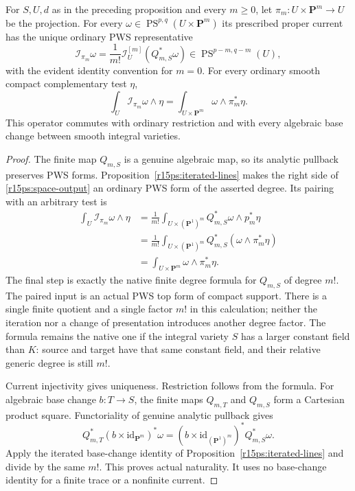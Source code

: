 \begin{theorem}
\label{r15ps:projective-space}
For $S,U,d$ as in the preceding proposition and every $m\geq0$,
let $\pi_m:U\times\mathbf P^m\to U$ be the projection.
For every $\omega\in\operatorname{PS}^{p,q}
(U\times\mathbf P^m)$ its prescribed proper current has the
unique ordinary PWS representative
\[
 \mathcal I_{\pi_m}\omega
   =\frac1{m!}\mathcal I^{[m]}_U(Q_{m,S}^*\omega)
       \in\operatorname{PS}^{p-m,q-m}(U),
\tag{PS15.5}\label{r15ps:space-output}
\]
with the evident identity convention for $m=0$.
For every ordinary smooth compact complementary test $\eta$,
\[
 \int_U\mathcal I_{\pi_m}\omega\wedge\eta
       =\int_{U\times\mathbf P^m}\omega\wedge\pi_m^*\eta.
\tag{PS15.6}\label{r15ps:space-pairing}
\]
This operator commutes with ordinary restriction and with every
algebraic base change between smooth integral varieties.
\end{theorem}

\begin{proof}
The finite map $Q_{m,S}$ is a genuine algebraic map, so its
analytic pullback preserves PWS forms.  Proposition~\ref{r15ps:iterated-lines}
makes the right side of \eqref{r15ps:space-output} an ordinary
PWS form of the asserted degree.
Its pairing with an arbitrary test is
\[
 \begin{split}
 \int_U\mathcal I_{\pi_m}\omega\wedge\eta
 &=\frac1{m!}\int_{U\times(\mathbf P^1)^m}
                         Q_{m,S}^*\omega\wedge p_m^*\eta\\
 &=\frac1{m!}\int_{U\times(\mathbf P^1)^m}
                      Q_{m,S}^*(\omega\wedge\pi_m^*\eta)\\
 &=\int_{U\times\mathbf P^m}\omega\wedge\pi_m^*\eta.
 \end{split}
\tag{PS15.7}\label{r15ps:one-native-factor}
\]
The final step is exactly the native finite degree formula
for $Q_{m,S}$ of degree $m!$.  The paired input is an actual
PWS top form of compact support.  There is a single finite
quotient and a single factor $m!$ in this calculation; neither
the iteration nor a change of presentation introduces another
degree factor.  The formula remains the native one if the
integral variety $S$ has a larger constant field than $K$:
source and target have that same constant field, and their
relative generic degree is still $m!$.

Current injectivity gives uniqueness.  Restriction follows from
the formula.  For algebraic base change $b:T\to S$, the finite
maps $Q_{m,T}$ and $Q_{m,S}$ form a Cartesian product square.
Functoriality of genuine analytic pullback gives
\[
 Q_{m,T}^*(b\times\mathrm{id}_{\mathbf P^m})^*\omega
       =(b\times\mathrm{id}_{(\mathbf P^1)^m})^*
                                                     Q_{m,S}^*\omega.
\]
Apply the iterated base-change identity of
Proposition~\ref{r15ps:iterated-lines} and divide by the same
$m!$.  This proves actual naturality.  It uses no base-change
identity for a finite trace or a nonfinite current.
\end{proof}

